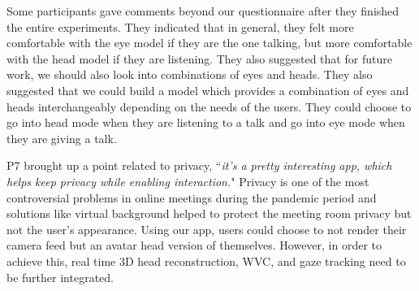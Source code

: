 Some participants gave comments beyond our questionnaire after they finished the entire experiments. They indicated that in general, they felt more comfortable with the eye model if they are the one talking, but more comfortable with the head model if they are listening. 
They also suggested that for future work, we should also look into combinations of eyes and heads. They also suggested that we could build a model which provides a combination of eyes and heads interchangeably depending on the needs of the users. They could choose to go into head mode when they are listening to a talk and go into eye mode when they are giving a talk.

P7 brought up a point related to privacy, ``\textit{it’s a  pretty interesting app, which helps keep privacy while enabling interaction.}" Privacy is one of the most controversial problems in online meetings during the pandemic period and solutions like virtual background helped to protect the meeting room privacy but not the user's appearance. Using our app, users could choose to not render their camera feed but an avatar head version of themselves. However, in order to achieve this, real time 3D head reconstruction, WVC, and gaze tracking need to be further integrated.
